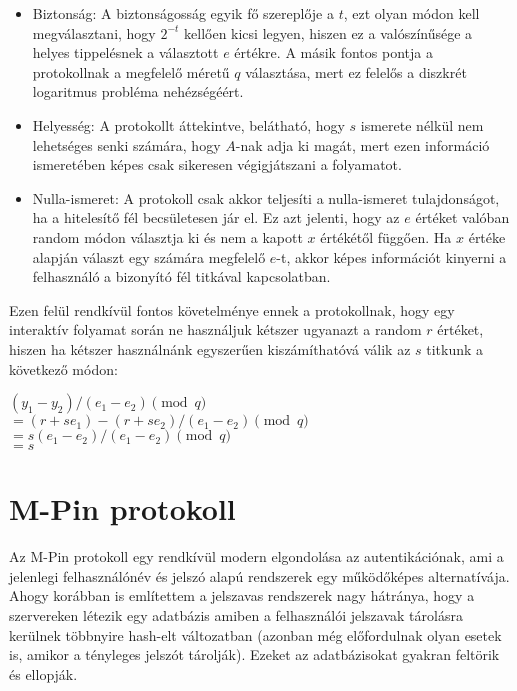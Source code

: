 \begin{itemize}
    \item Biztonság: A biztonságosság egyik fő szereplője a $t$, ezt olyan módon kell megválasztani, hogy $2^{-t}$ kellően kicsi legyen, hiszen ez a valószínűsége a helyes tippelésnek a választott $e$ értékre. A másik fontos pontja a protokollnak a megfelelő méretű $q$ választása, mert ez felelős a diszkrét logaritmus probléma nehézségéért.
    \item Helyesség: A protokollt áttekintve, belátható, hogy $s$ ismerete nélkül nem lehetséges senki számára, hogy $A$-nak adja ki magát, mert ezen információ ismeretében képes csak sikeresen végigjátszani a folyamatot.
    \item Nulla-ismeret: A protokoll csak akkor teljesíti a nulla-ismeret tulajdonságot, ha a hitelesítő fél becsületesen jár el. Ez azt jelenti, hogy az $e$ értéket valóban random módon választja ki és nem a kapott $x$ értékétől függően. Ha $x$ értéke alapján választ egy számára megfelelő $e$-t, akkor képes információt kinyerni a felhasználó a bizonyító fél titkával kapcsolatban.
\end{itemize}

\begin{minipage}{\textwidth}
Ezen felül rendkívül fontos követelménye ennek a protokollnak, hogy egy interaktív folyamat során ne használjuk kétszer ugyanazt a random $r$ értéket, hiszen ha kétszer használnánk egyszerűen kiszámíthatóvá válik az $s$ titkunk a következő módon:

$(y_1 - y_2) / (e_1 - e_2) \pmod{q}$ \\
$= (r + se_1) - (r + se_2) / (e_1 - e_2) \pmod{q}$ \\
$= s(e_1 - e_2) / (e_1 - e_2) \pmod{q}$ \\
$= s$
\end{minipage}

\section{M-Pin protokoll}

Az M-Pin protokoll \cite{MPin} egy rendkívül modern elgondolása az autentikációnak, ami a jelenlegi felhasználónév és jelszó alapú rendszerek egy működőképes alternatívája. Ahogy korábban is említettem a jelszavas rendszerek nagy hátránya, hogy a szervereken létezik egy adatbázis amiben a felhasználói jelszavak tárolásra kerülnek többnyire hash-elt változatban (azonban még előfordulnak olyan esetek is, amikor a tényleges jelszót tárolják). Ezeket az adatbázisokat gyakran feltörik és ellopják.

